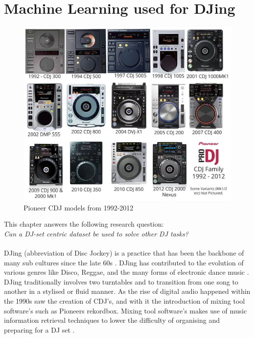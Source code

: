 
\graphicspath{{Chapter3/}}

\chapter{Machine Learning used for DJing}

\begin{figure}[H]
	\includegraphics[scale=0.3]{images/pioneers_history}
	\centering
	\caption{Pioneer CDJ models from 1992-2012 \citep{chesters_history_2017}} 
\end{figure}

This chapter answers the following research question:
\\

\textit{Can a DJ-set centric dataset be used to solve other DJ tasks?} 
\\
\\
DJing (abbreviation of Disc Jockey) is a practice that has been the backbone of many sub cultures since the late 60s \citep{brewster_last_2014}. DJing has contributed to the evolution of various genres like Disco, Reggae, and the many forms of electronic dance music \citep{partridge_dub_2010} \citep{reynolds_energy_2013}. DJing traditionally involves two turntables and to transition from one song to another in a stylised or fluid manner. As the rise of digital audio happened within the 1990s saw the creation of CDJ's, and with it the introduction of mixing tool software's such as Pioneers rekordbox. Mixing tool software's makes use of music information retrieval techniques to lower the difficulty of organising and preparing for a DJ set \citep{kim_automatic_2017}. 


